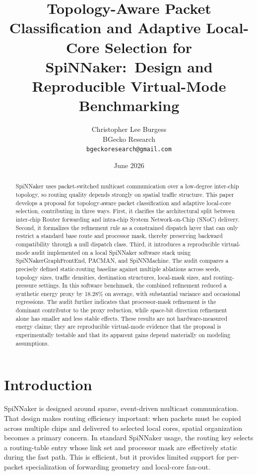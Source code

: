 \documentclass[11pt]{article}
\title{Topology-Aware Packet Classification and Adaptive Local-Core Selection for SpiNNaker:\
Design and Reproducible Virtual-Mode Benchmarking}
\author{Christopher Lee Burgess\\BGecko Research\\\texttt{bgeckoresearch@gmail.com}}
\date{June 2026}
\begin{document}
\maketitle

\begin{abstract}
SpiNNaker uses packet-switched multicast communication over a low-degree inter-chip topology, so routing quality depends strongly on spatial traffic structure. This paper develops a proposal for topology-aware packet classification and adaptive local-core selection, contributing in three ways. First, it clarifies the architectural split between inter-chip Router forwarding and intra-chip System Network-on-Chip (SNoC) delivery. Second, it formalizes the refinement rule as a constrained dispatch layer that can only restrict a standard base route and processor mask, thereby preserving backward compatibility through a null dispatch class. Third, it introduces a reproducible virtual-mode audit implemented on a local SpiNNaker software stack using SpiNNakerGraphFrontEnd, PACMAN, and SpiNNMachine. The audit compares a precisely defined static-routing baseline against multiple ablations across seeds, topology sizes, traffic densities, destination structures, local-mask sizes, and routing-pressure settings. In this software benchmark, the combined refinement reduced a synthetic energy proxy by 18.28\% on average, with substantial variance and occasional regressions. The audit further indicates that processor-mask refinement is the dominant contributor to the proxy reduction, while space-bit direction refinement alone has smaller and less stable effects. These results are not hardware-measured energy claims; they are reproducible virtual-mode evidence that the proposal is experimentally testable and that its apparent gains depend materially on modeling assumptions.
\end{abstract}

\section{Introduction}
SpiNNaker is designed around sparse, event-driven multicast communication. That design makes routing efficiency important: when packets must be copied across multiple chips and delivered to selected local cores, spatial organization becomes a primary concern. In standard SpiNNaker usage, the routing key selects a routing-table entry whose link set and processor mask are effectively static during the fast path. This is efficient, but it provides limited support for per-packet specialization of forwarding geometry and local-core fan-out.
\end{document}
